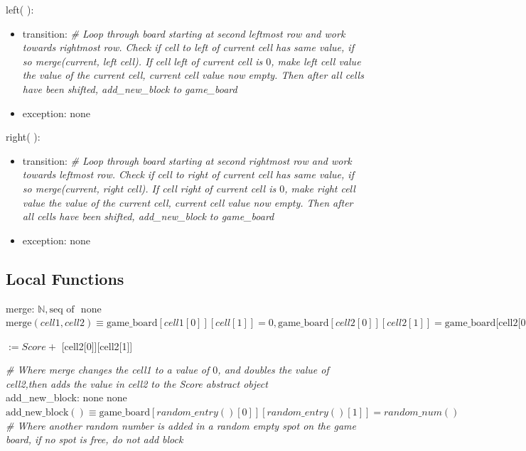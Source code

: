 \documentclass[12pt]{article}
\begin{document}
\noindent left( ):
\begin{itemize}
\item transition: \textit{\# Loop through board starting at second leftmost row and work towards rightmost row. Check if cell to left of current cell has same value, if so merge(current, left cell). If cell left of current cell is $0$, make left cell value the value of the current cell, current cell value now empty. Then after all cells have been shifted, add\_new\_block to game\_board} ~\\
\item exception: none
\end{itemize}

\noindent right( ):
\begin{itemize}
\item transition: \textit{\# Loop through board starting at second rightmost row and work towards leftmost row. Check if cell to right of current cell has same value, if so merge(current, right cell). If cell right of current cell is $0$, make right cell value the value of the current cell, current cell value now empty. Then after all cells have been shifted, add\_new\_block to game\_board} ~\\
\item exception: none
\end{itemize}

\subsection*{Local Functions}

\noindent merge:  $\mathbb{N}, \text{seq of } $ \rightarrow none \\
\noindent $\mbox{merge}(cell1, cell2) \equiv \text{game\_board}[cell1[0]][cell[1]] = 0, \text{game\_board}[cell2[0]][cell2[1]] = \text{game\_board[cell2[0]][cell2[1]] x 2} $

 $:= Score +$ [cell2[0]][cell2[1]]

\textit{\# Where merge changes the cell1 to a value of $0$, and doubles the value of cell2,then adds the value in cell2 to the Score abstract object} ~\\

\noindent add\_new\_block: none \rightarrow none \\
\noindent $\mbox{add\_new\_block}() \equiv \text{game\_board}[random\_entry()[0]][random\_entry()[1]] = random\_num() $
\textit{\# Where another random number is added in a random empty spot on the game board, if no spot is free, do not add block} ~\\
\end{document}
